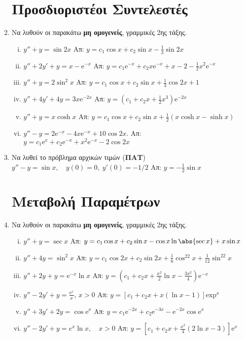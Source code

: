 \begin{enumerate}
  \section*{Προσδιοριστέοι Συντελεστές}

\item Να λυθούν οι παρακάτω \textbf{μη ομογενείς}, γραμμικές 2ης τάξης.
  \begin{enumerate}[i)]
    \item $y''+y=\sin 2x$ \hfill Απ: $y=c_1\cos x+c_2\sin x-\frac{1}{3}\sin 2x$
    \item $y''+2y'+y=x- \mathrm{e}^{-x}$
      \hfill Απ: $y=c_1 \mathrm{e}^{-x}+c_2x \mathrm{e}^{-x}+x-2-\frac{1}{2}x^2
      \mathrm{e}^{-x}$
     \item $y''+y=2\sin^2 x$ \hfill Απ: $y=c_1\cos x+c_2\sin x+\frac{1}{3}\cos 2x+1$
     \item $y''+4y'+4y=3x \mathrm{e}^{-2x}$ \hfill Απ: $y=(c_1+c_2x+\frac{1}{2}x^3)
       \mathrm{e}^{-2x}$
    \item $y''+y=x\cosh x$ 
      \hfill Απ: $y=c_1\cos x+c_2\sin x +\frac{1}{2}(x\cosh x-\sinh x)$
    \item $y''-y=2 \mathrm{e}^{-x} - 4x \mathrm{e}^{-x} + 10 \cos{2x}$.
      \hfill Απ: $ y= c_{1} \mathrm{e}^{x} + c_{2} \mathrm{e}^{-x} + x^{2} 
      \mathrm{e}^{-x} - 2 \cos{2x}$ 
  \end{enumerate}

\item Να λυθεί το πρόβλημα αρχικών τιμών (\textbf{ΠΑΤ}) 
  $
  y''-y=\sin x, \quad y(0)=0,\; y'(0)=-{1}/{2}
  $
  \hfill Απ: $y= -\frac{1}{2}\sin x$

  \section*{Μεταβολή Παραμέτρων}

\item Να λυθούν οι παρακάτω \textbf{μη ομογενείς}, γραμμικές 2ης τάξης.
  \begin{enumerate}[i)]
    \item $y''+y=\sec x$ 
      \hfill Απ: $y=c_1\cos x+c_2\sin x - \cos x\ln\abs{\sec x}+x\sin x$
    \item $y''+4y=\sin^2x$ 
      \hfill Απ: $y=c_1\cos 2x+c_2\sin 2x+\frac{1}{6}\cos^22x+\frac{1}{12}\sin^22x$
    \item $y''+2y+y= \mathrm{e}^{-x}\ln x$ 
      \hfill Απ: $y=(c_1+c_2x+\frac{x^2}{2}\ln x-\frac{3x^2}{4}) \mathrm{e}^{-x}$
    \item $y''-2y'+y=\frac{\mathrm{e}^x}{x}$, \quad $x>0$ 
      \hfill Απ: $y= [c_{1} + c_{2} x + x(\ln x-1)] \mathrm{exp}^{x} $
    \item $y''+3y'+2y=\cos \mathrm{e}^{x}$ \hfill Απ: $y= c_{1} \mathrm{e}^{-2x} + 
      c_{2} \mathrm{e}^{-3x} - \mathrm{e}^{-2x}\cos \mathrm{e}^{x}$
    \item $y''-2y'+y=e^{x}\ln x, \quad x>0$ 
      \hfill Απ: $y= [c_{1}+ c_{2}x + \frac{x^{2}}{4}(2\ln x-3)] \mathrm{e}^{x}$
  \end{enumerate}


\end{enumerate}
